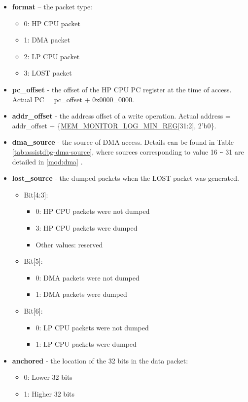 \documentclass[main\_\_EN.tex]{subfiles}
\begin{document}
\begin{itemize}
    \item \textbf{format} – the packet type:
        \begin{itemize}
            \item 0: HP CPU packet
            \item 1: DMA packet
            \item 2: LP CPU packet
            \item 3: LOST packet
        \end{itemize}
    \item \textbf{pc\_offset} - the offset of the HP CPU PC register at the time of access. Actual PC = pc\_offset + 0x0000\_0000.
    \item \textbf{addr\_offset} - the address offset of a write operation. Actual address = addr\_offset + \{\hyperref[regdesc:MEMMONITORLOGMINREG]{MEM\_MONITOR\_LOG\_MIN\_REG}[31:2], 2'b0\}.
    \item \textbf{dma\_source} - the source of DMA access. Details can be found in Table \ref{tab:assistdbg-dma-source}, where sources corresponding to value 16 \verb+~+ 31 are detailed in \ref{mod:dma} \textit{}.
    \item \textbf{lost\_source} - the dumped packets when the LOST packet was generated.
    \begin{itemize}
        \item Bit[4:3]:
        \begin{itemize}
            \item 0: HP CPU packets were not dumped
            \item 3: HP CPU packets were dumped
            \item Other values: reserved
        \end{itemize}
        \item Bit[5]:
        \begin{itemize}
            \item 0: DMA packets were not dumped
            \item 1: DMA packets were dumped
        \end{itemize}
        \item Bit[6]:
        \begin{itemize}
            \item 0: LP CPU packets were not dumped
            \item 1: LP CPU packets were dumped
        \end{itemize}
    \end{itemize}
    \item \textbf{anchored} - the location of the 32 bits in the data packet:
    \begin{itemize}
        \item 0: Lower 32 bits
        \item 1: Higher 32 bits
    \end{itemize}
\end{itemize}
\end{document}

